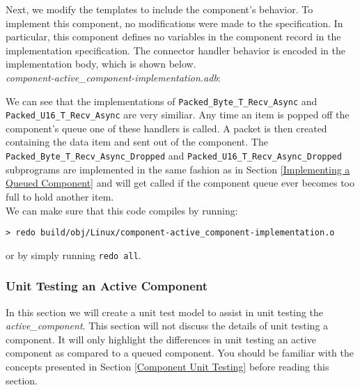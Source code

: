 Next, we modify the templates to include the component's behavior. To implement this component, no modifications were made to the specification. In particular, this component defines no variables in the component record in the implementation specification. The connector handler behavior is encoded in the implementation body, which is shown below. \\

\textit{component-active\_component-implementation.adb}:

We can see that the implementations of \texttt{Packed\_Byte\_T\_Recv\_Async} and \texttt{Packed\_U16\_T\_Recv\_Async} are very similiar. Any time an item is popped off the component's queue one of these handlers is called. A packet is then created containing the data item and sent out of the component. The \texttt{Packed\_Byte\_T\_Recv\_Async\_Dropped} and \texttt{Packed\_U16\_T\_Recv\_Async\_Dropped} subprograms are implemented in the same fashion as in Section \ref{Implementing a Queued Component} and will get called if the component queue ever becomes too full to hold another item. \\

We can make sure that this code compiles by running:

\vspace{5mm} %
\begin{verbatim}
> redo build/obj/Linux/component-active_component-implementation.o
\end{verbatim}
\vspace{5mm} %

or by simply running \texttt{redo all}. \\

\subsubsection{Unit Testing an Active Component}

In this section we will create a unit test model to assist in unit testing the \textit{active\_component}. This section will not discuss the details of unit testing a component. It will only highlight the differences in unit testing an active component as compared to a queued component. You should be familiar with the concepts presented in Section \ref{Component Unit Testing} before reading this section. \\

